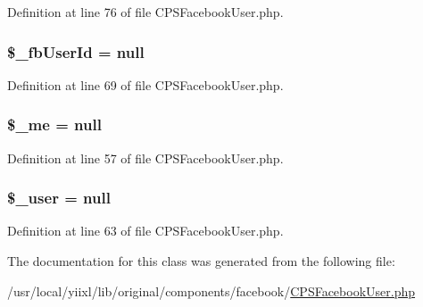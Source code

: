 Definition at line 76 of file CPSFacebookUser.php.

\hypertarget{classCPSFacebookUser_a19e04e69bd6cde6129a45de979954cfa}{
\subsubsection[{\$\_\-fbUserId}]{\setlength{\rightskip}{0pt plus 5cm}\$\_\-fbUserId = null}}
\label{classCPSFacebookUser_a19e04e69bd6cde6129a45de979954cfa}


Definition at line 69 of file CPSFacebookUser.php.

\hypertarget{classCPSFacebookUser_a45e53d351918dc7cad7136ff44e1724b}{
\subsubsection[{\$\_\-me}]{\setlength{\rightskip}{0pt plus 5cm}\$\_\-me = null}}
\label{classCPSFacebookUser_a45e53d351918dc7cad7136ff44e1724b}


Definition at line 57 of file CPSFacebookUser.php.

\hypertarget{classCPSFacebookUser_a5df5982b9dadc74df05081972cd67fdf}{
\subsubsection[{\$\_\-user}]{\setlength{\rightskip}{0pt plus 5cm}\$\_\-user = null}}
\label{classCPSFacebookUser_a5df5982b9dadc74df05081972cd67fdf}


Definition at line 63 of file CPSFacebookUser.php.



The documentation for this class was generated from the following file:\begin{DoxyCompactItemize}
\item 
/usr/local/yiixl/lib/original/components/facebook/\hyperlink{CPSFacebookUser_8php}{CPSFacebookUser.php}\end{DoxyCompactItemize}
